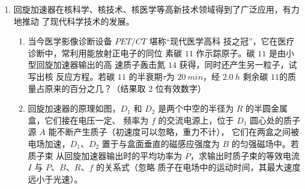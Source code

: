 \begin{enumerate}
\begin{enumerate}
\end{enumerate}
\begin{figure}[h!]
	\flushright
	
\end{figure}






\item 
{}
回旋加速器在核科学、核技术、核医学等高新技术领域得到了广泛应用，有力地推动
了现代科学技术的发展。
\begin{enumerate}
	\item
当今医学影像诊断设备 $ PET/CT $ 堪称“现代医学高科
技之冠”，它在医疗诊断中，常利用能放射正电子的同位
素碳 $ 11 $ 作示踪原子。碳 $ 11 $ 是由小型回旋加速器输出的高
速质子轰击氮 $ 14 $ 获得，同时还产生另一粒子，试写出核
反应方程。若碳 $ 11 $ 的半衰期$ \tau $为 $ 20 \ min $，经 $ 2.0 \ h $ 剩余碳
$ 11 $的质量占原来的百分之几？（结果取 $ 2 $ 位有效数字）


\item 
回旋加速器的原理如图，$ D_{1} $ 和 $ D_{2} $ 是两个中空的半径为 $ R $ 的半圆金属盒，它们接在电压一定、
频率为 $ f $ 的交流电源上，位于 $ D_{1} $ 圆心处的质子源 $ A $ 能不断产生质子（初速度可以忽略，重力不计），
它们在两盒之间被电场加速，$ D_{1} $、$ D_{2} $ 置于与盒面垂直的磁感应强度为 $ B $ 的匀强磁场中。若质子束
从回旋加速器输出时的平均功率为 $ P $，求输出时质子束的等效电流 $ I $ 与 $ P $、$ B $、$ R $、$ f $ 的关系式（忽略
质子在电场中的运动时间，其最大速度远小于光速）。


\end{enumerate}
\end{enumerate}
